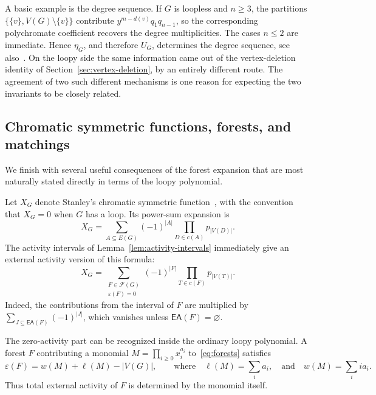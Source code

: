 \documentclass[11pt]{article}
\theoremstyle{plain}
\theoremstyle{definition}
\renewcommand{\mathcal}{\mathscr}
\newcommand{\ds}{\displaystyle}
\newcommand{\cF}{\mathcal{F}}    %
\newcommand{\EA}{\mathsf{EA}} %
\newcommand{\eps}{\varepsilon}
\numberwithin{equation}{section}
\begin{document}
A basic example is the degree sequence.  If $G$ is loopless and $n\ge 3$,
the partitions $\{\{v\},V(G)\setminus\{v\}\}$ contribute
$y^{m-d(v)}q_1q_{n-1}$, so the corresponding polychromate coefficient
recovers the degree multiplicities.  The cases $n\le2$ are immediate.
Hence $\eta_G$, and therefore $U_G$, determines the degree sequence, see
also~\cite[Proposition~26.56]{Nob}.  On the loopy side the same information came out of the vertex-deletion
identity of Section~\ref{sec:vertex-deletion}, by an entirely different
route.  The agreement of two such different mechanisms is one reason for
expecting the two invariants to be closely related.

\subsection{Chromatic symmetric functions, forests, and matchings}\label{subsec:X-and-matchings}

We finish with several useful consequences of the forest expansion that are
most naturally stated directly in terms of the loopy polynomial.

Let $X_G$ denote Stanley's chromatic symmetric function~\cite{Sta}, with the convention that $X_G=0$ when $G$ has a loop.
Its power-sum expansion is
\begin{equation}\label{eq:X-powersum}
   X_G
   =
   \sum_{A\subseteq E(G)}
   (-1)^{|A|}
   \prod_{D\in c(A)}p_{|V(D)|}.
\end{equation}
The activity intervals of Lemma~\ref{lem:activity-intervals} immediately give
an external activity version of this formula:
\begin{equation}\label{eq:X-zero-activity}
   X_G
   =
   \sum_{\substack{F\in\cF(G)\\ \eps(F)=0}}
   (-1)^{|F|}
   \prod_{T\in c(F)}p_{|V(T)|}.
\end{equation}
Indeed, the contributions from the interval of $F$ are multiplied by
$\ds \sum_{J\subseteq\EA(F)}(-1)^{|J|}$,
which vanishes unless $\EA(F)=\varnothing$.

The zero-activity part can be recognized inside the ordinary loopy polynomial.
A forest $F$ contributing a monomial
$\ds M=\prod_{i\ge 0}x_i^{a_i}$ to~\eqref{eq:forests} satisfies
\begin{equation}\label{eq:activity-from-monomial}
   \eps(F)=w(M)+\ell(M)-|V(G)|, \qquad \text{where} \quad
   \ell(M)=\sum_i a_i,
   \quad  \text{and} \quad
   w(M)=\sum_i i a_i.
\end{equation}
Thus total external activity of $F$ is determined by the monomial itself.
\end{document}
